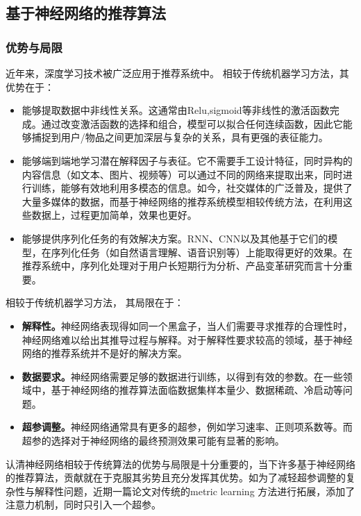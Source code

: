 \subsection{基于神经网络的推荐算法}
\subsubsection{优势与局限}

近年来，深度学习技术被广泛应用于推荐系统中。
相较于传统机器学习方法，其优势在于：

\begin{itemize}
    \item 能够提取数据中非线性关系。这通常由Relu,sigmoid等非线性的激活函数完成。通过改变激活函数的选择和组合，模型可以拟合任何连续函数\cite{hornik1989multilayer}，因此它能够捕捉到用户/物品之间更加深层与复杂的关系，具有更强的表征能力。
    \item 能够端到端地学习潜在解释因子与表征。它不需要手工设计特征，同时异构的内容信息（如文本、图片、视频等）可以通过不同的网络来提取出来，同时进行训练，能够有效地利用多模态的信息。如今，社交媒体的广泛普及，提供了大量多媒体的数据，而基于神经网络的推荐系统模型相较传统方法，在利用这些数据上，过程更加简单，效果也更好。
    \item 能够提供序列化任务的有效解决方案。RNN、CNN以及其他基于它们的模型，在序列化任务（如自然语言理解、语音识别等）上能取得更好的效果。在推荐系统中，序列化处理对于用户长短期行为分析、产品变革研究而言十分重要。
\end{itemize} 

相较于传统机器学习方法， 其局限在于：
\begin{itemize}

    \item\textbf{ 解释性。}神经网络表现得如同一个黑盒子，当人们需要寻求推荐的合理性时，神经网络难以给出其推导过程与解释。对于解释性要求较高的领域，基于神经网络的推荐系统并不是好的解决方案。
    \item \textbf{数据要求。}神经网络需要足够的数据进行训练，以得到有效的参数。在一些领域中，基于神经网络的推荐算法面临数据集样本量少、数据稀疏、冷启动等问题。
    \item \textbf{超参调整。}神经网络通常具有更多的超参，例如学习速率、正则项系数等。而超参的选择对于神经网络的最终预测效果可能有显著的影响。
\end{itemize}

认清神经网络相较于传统算法的优势与局限是十分重要的，当下许多基于神经网络的推荐算法，贡献就在于克服其劣势且充分发挥其优势。如为了减轻超参调整的复杂性与解释性问题，近期一篇论文\cite{tay2018latent}对传统的metric learning 方法进行拓展，添加了注意力机制，同时只引入一个超参。

